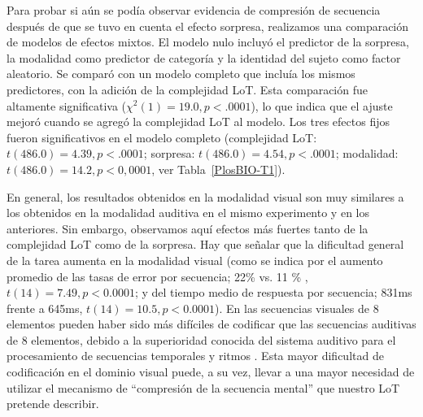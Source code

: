 Para probar si aún se podía observar evidencia de compresión de secuencia después de que se tuvo en cuenta el efecto sorpresa, realizamos una comparación de modelos de efectos mixtos. El modelo nulo incluyó el predictor de la sorpresa, la modalidad como predictor de categoría y la identidad del sujeto como factor aleatorio. Se comparó con un modelo completo que incluía los mismos predictores, con la adición de la complejidad LoT. Esta comparación fue altamente significativa ($\chi^2 (1) = 19.0, p <.0001$), lo que indica que el ajuste mejoró cuando se agregó la complejidad LoT al modelo. Los tres efectos fijos fueron significativos en el modelo completo (complejidad LoT: $t (486.0) = 4.39, p <.0001$; sorpresa: $t (486.0) = 4.54, p <.0001$; modalidad: $t (486.0) = 14.2, p <0,0001$, ver Tabla~\ref{PlosBIO-T1}).


En general, los resultados obtenidos en la modalidad visual son muy similares a los obtenidos en la modalidad auditiva en el mismo experimento y en los anteriores. Sin embargo, observamos aquí efectos más fuertes tanto de la complejidad LoT como de la sorpresa. Hay que señalar que la dificultad general de la tarea aumenta en la modalidad visual (como se indica por el aumento promedio de las tasas de error por secuencia; 22\% vs. 11 \% , $t (14) = 7.49, p <0.0001$; y del tiempo medio de respuesta por secuencia; 831ms frente a 645ms, $t(14) = 10.5, p <0.0001$). En las secuencias visuales de 8 elementos pueden haber sido más difíciles de codificar que las secuencias auditivas de 8 elementos, debido a la superioridad conocida del sistema auditivo para el procesamiento de secuencias temporales y ritmos \cite{f90,f92}. Esta mayor dificultad de codificación en el dominio visual puede, a su vez, llevar a una mayor necesidad de utilizar el mecanismo de ``compresión de la secuencia mental'' que nuestro LoT pretende describir.

